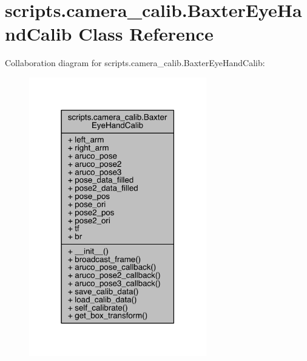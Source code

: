 \hypertarget{classscripts_1_1camera__calib_1_1_baxter_eye_hand_calib}{}\section{scripts.\+camera\+\_\+calib.\+Baxter\+Eye\+Hand\+Calib Class Reference}
\label{classscripts_1_1camera__calib_1_1_baxter_eye_hand_calib}


Collaboration diagram for scripts.\+camera\+\_\+calib.\+Baxter\+Eye\+Hand\+Calib\+:\nopagebreak
\begin{figure}[H]
\begin{center}
\leavevmode
\includegraphics[width=219pt]{classscripts_1_1camera__calib_1_1_baxter_eye_hand_calib__coll__graph}
\end{center}
\end{figure}
